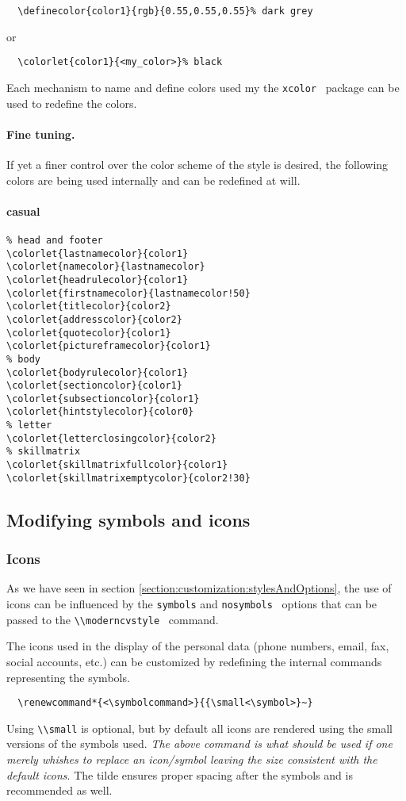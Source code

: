 \documentclass[a4paper,11pt]{article}
\newcommand{\code}[1]{\lstinline!#1!}
\newcommand{\Code}[1]{\lstinline!#1!~} %
\begin{document}
\begin{lstlisting}
  \definecolor{color1}{rgb}{0.55,0.55,0.55}% dark grey
\end{lstlisting}
or
\begin{lstlisting}
  \colorlet{color1}{<my_color>}% black
\end{lstlisting}
Each mechanism to name and define colors used my the \Code{xcolor} package can be used to redefine the colors.

\paragraph{Fine tuning.} If yet a finer control over the color scheme of the style is desired, the following colors are being used internally and can be redefined at will.  

\paragraph{casual}
\begin{lstlisting}
% head and footer
\colorlet{lastnamecolor}{color1}
\colorlet{namecolor}{lastnamecolor}
\colorlet{headrulecolor}{color1}
\colorlet{firstnamecolor}{lastnamecolor!50}
\colorlet{titlecolor}{color2}
\colorlet{addresscolor}{color2}
\colorlet{quotecolor}{color1}
\colorlet{pictureframecolor}{color1}
% body
\colorlet{bodyrulecolor}{color1}
\colorlet{sectioncolor}{color1}
\colorlet{subsectioncolor}{color1}
\colorlet{hintstylecolor}{color0}
% letter
\colorlet{letterclosingcolor}{color2}
% skillmatrix
\colorlet{skillmatrixfullcolor}{color1}
\colorlet{skillmatrixemptycolor}{color2!30}

\end{lstlisting}


\subsection{Modifying symbols and icons}
\subsubsection{Icons}
As we have seen in section \ref{section:customization:stylesAndOptions}, the use of icons can be 
influenced by the \code{symbols} and \Code{nosymbols} options that can be passed to the \Code{\\moderncvstyle} command. \medskip

The icons used in the display of the personal data (phone numbers, email, fax, social accounts, etc.) can be customized by redefining the internal commands representing the symbols.
\begin{lstlisting}
  \renewcommand*{<\symbolcommand>}{{\small<\symbol>}~}
\end{lstlisting} 
Using \code{\\small} is optional, but by default all icons are rendered using the small 
versions of the symbols used. \emph{The above command is what should be used if one merely whishes to 
  replace an icon/symbol leaving the size consistent with the default icons}.
The tilde ensures proper spacing after the symbols and is recommended as well.
\end{document}
